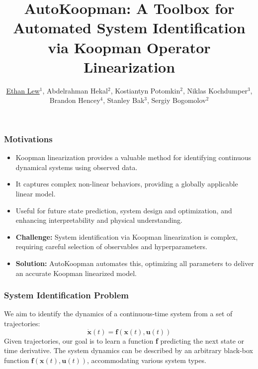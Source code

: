 \documentclass[shortpres,aspectratio=43]{beamer}
\title[AutoKoopman]{AutoKoopman: A Toolbox for Automated System Identification via Koopman Operator Linearization}
\author[Lew et al.]{\underline{Ethan Lew}$^1$, Abdelrahman Hekal$^2$, Kostiantyn Potomkin$^2$, Niklas Kochdumper$^3$, Brandon Hencey$^4$, Stanley Bak$^3$, Sergiy Bogomolov$^2$}
\institute[Galois Inc.]{$^1$Galois Inc., $^2$Newcastle University, \\$^3$ Stony Brook University, $^4$Air Force Research Laboratory}
\date[ATVA 2023]{}
\begin{document}


\begin{frame}[plain]
    \titlepage
\end{frame}

\begin{frame}
\frametitle{Motivations}
\begin{itemize}
    \item<1-> Koopman linearization provides a valuable method for identifying continuous dynamical systems using observed data.
    \item<2-> It captures complex non-linear behaviors, providing a globally applicable linear model.
    \item<3-> Useful for future state prediction, system design and optimization, and enhancing interpretability and physical understanding.
    \item<4-> \textbf{Challenge:} System identification via Koopman linearization is complex, requiring careful selection of observables and hyperparameters.
    \item<5-> \textbf{Solution:} AutoKoopman automates this, optimizing all parameters to deliver an accurate Koopman linearized model.
\end{itemize}
\end{frame}

\begin{frame}
\frametitle{System Identification Problem}
We aim to identify the dynamics of a continuous-time system from a set of trajectories:
\begin{equation}
\dot{\mathbf{x}}(t) = \mathbf{f}(\mathbf{x}(t), \mathbf{u}(t))
\end{equation}
\pause
Given trajectories, our goal is to learn a function \textbf{f} predicting the next state or time derivative. The system dynamics can be described by an arbitrary black-box function $\mathbf{f}(\mathbf{x}(t), \mathbf{u}(t))$, accommodating various system types.
\end{frame}
\end{document}
